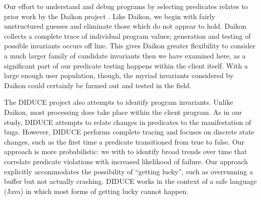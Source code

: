 Our effort to understand and debug programs by selecting predicates
relates to prior work by the Daikon project \cite{ernst2001}.  Like
Daikon, we begin with fairly unstructured guesses and eliminate those
which do not appear to hold.  Daikon collects a complete trace of
individual program values; generation and testing of possible
invariants occurs off line.  This gives Daikon greater flexibility to
consider a much larger family of candidate invariants then we have
examined here, as a significant part of our predicate testing happens
within the client itself.  With a large enough user population,
though, the myriad invariants considered by Daikon could certainly be
farmed out and tested in the field.

The DIDUCE project \cite{Hangal:DIDUCE:2002} also attempts to identify
program invariants.  Unlike Daikon, most processing does take place
within the client program.  As in our study, DIDUCE attempts to relate
changes in predicates to the manifestation of bugs.  However, DIDUCE
performs complete tracing and focuses on discrete state changes, such
as the first time a predicate transitioned from true to false.  Our
approach is more probabilistic: we with to identify broad trends over
time that correlate predicate violations with increased likelihood of
failure.  Our approach explicitly accommodates the possibility of
``getting lucky'', such as overrunning a buffer but not actually
crashing.  DIDUCE works in the context of a safe language (Java) in
which most forms of getting lucky cannot happen.


